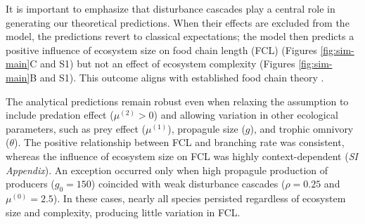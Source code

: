 \documentclass[11pt, class=article, crop=false]{standalone}
\begin{document}
It is important to emphasize that disturbance cascades play a central role in generating our theoretical predictions.
When their effects are excluded from the model, the predictions revert to classical expectations; the model then predicts a positive influence of ecosystem size on food chain length (FCL) (Figures \ref{fig:sim-main}C and S1) but not an effect of ecosystem complexity (Figures \ref{fig:sim-main}B and S1).
This outcome aligns with established food chain theory \citep{holt_food_2002, takimoto_effects_2012, terui_spatial_2019, guo_towards_2023}.

The analytical predictions remain robust even when relaxing the assumption to include predation effect ($\mu^{(2)} > 0$) and allowing variation in other ecological parameters, such as prey effect ($\mu^{(1)}$), propagule size ($g$), and trophic omnivory ($\theta$).
The positive relationship between FCL and branching rate was consistent, whereas the influence of ecosystem size on FCL was highly context-dependent (\textit{SI Appendix}).
An exception occurred only when high propagule production of producers ($g_0 = 150$) coincided with weak disturbance cascades ($\rho = 0.25$ and $\mu^{(0)} = 2.5$).
In these cases, nearly all species persisted regardless of ecosystem size and complexity, producing little variation in FCL.
\end{document}
